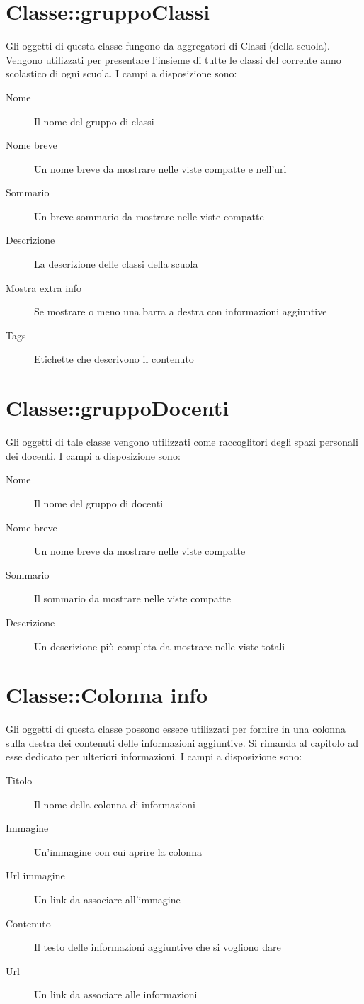 \section{Classe::gruppoClassi}
Gli oggetti di questa classe fungono da aggregatori di Classi (della scuola). Vengono utilizzati per presentare l'insieme di tutte le classi del corrente anno scolastico di ogni scuola. I campi a disposizione sono:
\begin{description}
\item[Nome]Il nome del gruppo di classi
\item[Nome breve]Un nome breve da mostrare nelle viste compatte e nell'url
\item[Sommario]Un breve sommario da mostrare nelle viste compatte
\item[Descrizione]La descrizione delle classi della scuola
\item[Mostra extra info]Se mostrare  o meno una barra a destra con informazioni aggiuntive
\item[Tags]Etichette che descrivono il contenuto
\end{description}

\section{Classe::gruppoDocenti}
Gli oggetti di tale classe vengono utilizzati come raccoglitori degli spazi personali dei docenti. I campi a disposizione sono:
\begin{description}
 \item[Nome]Il nome del gruppo di docenti
\item[Nome breve]Un nome breve da mostrare nelle viste compatte
\item[Sommario]Il sommario da mostrare nelle viste compatte
\item[Descrizione]Un descrizione più completa da mostrare nelle viste totali
\end{description}

\section{Classe::Colonna info}
Gli oggetti di questa classe possono essere utilizzati per fornire in una colonna sulla destra dei contenuti delle informazioni aggiuntive. Si rimanda al capitolo ad esse dedicato per ulteriori informazioni. I campi a disposizione sono:
\begin{description}
 \item[Titolo] Il nome della colonna di informazioni
\item[Immagine] Un'immagine con cui aprire la colonna
\item[Url immagine] Un link da associare all'immagine
\item[Contenuto] Il testo delle informazioni aggiuntive che si vogliono dare
\item[Url] Un link da associare alle informazioni
\end{description}

